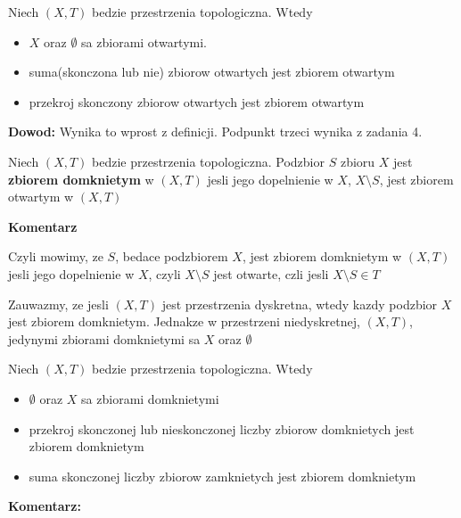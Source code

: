 \documentclass{article}
\begin{document}
\begin{tcolorbox}[colback=white!90!green,colframe=black!35!green,title=1.2.2 Lemat: Przestrzen topologiczna i zbiory otwarte]
Niech $(X, T)$ bedzie przestrzenia topologiczna. Wtedy

\begin{itemize}%
       
\item $X$ oraz $\emptyset$ sa zbiorami otwartymi.
\item suma(skonczona lub nie) zbiorow otwartych jest zbiorem otwartym
\item przekroj skonczony zbiorow otwartych jest zbiorem otwartym
\end{itemize}%
\end{tcolorbox}
\textbf{Dowod:}
Wynika to wprost z definicji. Podpunkt trzeci wynika z zadania 4.

\begin{tcolorbox}[colback=white!90!red,colframe=black!35!red,title=1.2.3 Definicja: Zbior domkniety- closed set]

Niech $(X,T)$ bedzie przestrzenia topologiczna. Podzbior $S$ zbioru $X$ jest \textbf{zbiorem domknietym} w $(X, T)$ jesli jego dopelnienie w $X$, $X\setminus S$, jest zbiorem otwartym w $(X, T)$
\end{tcolorbox}
\textbf{Komentarz}

Czyli mowimy, ze $S$, bedace podzbiorem $X$, jest zbiorem domknietym w $(X,T)$ jesli jego dopelnienie w $X$, czyli $X\setminus S$ jest otwarte, czli jesli $X\setminus S \in T$

Zauwazmy, ze jesli $(X,T)$ jest przestrzenia dyskretna, wtedy kazdy podzbior $X$ jest zbiorem domknietym. Jednakze w przestrzeni niedyskretnej, $(X,T)$, jedynymi zbiorami domknietymi sa $X$ oraz $\emptyset$

\begin{tcolorbox}[colback=white!90!green,colframe=black!35!green,title=1.2.5 Lemat: Przestrzen topologiczna i zbiory domkniete]

Niech $(X,T)$ bedzie przestrzenia topologiczna. Wtedy

\begin{itemize}%
\item $\emptyset$ oraz $X$ sa zbiorami domknietymi
\item przekroj skonczonej lub nieskonczonej liczby zbiorow domknietych jest zbiorem domknietym
\item suma skonczonej liczby zbiorow zamknietych jest zbiorem domknietym
    
\end{itemize}%
\end{tcolorbox}
\textbf{Komentarz:}
\end{document}

